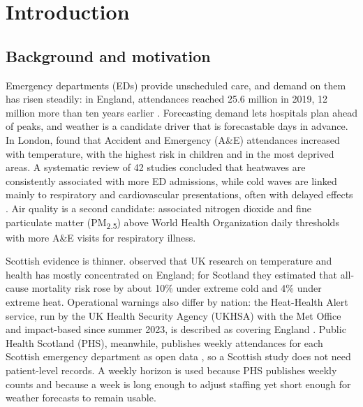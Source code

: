 \documentclass[12pt]{article}
\makeatletter
\let\thedate\@date
\makeatother
\begin{document}
\begin{titlepage}

	\vfill

\end{titlepage}




\newpage
\tableofcontents
\listoftables
\listoffigures

\newpage

\section{Introduction}

\subsection{Background and motivation}
Emergency departments (EDs) provide unscheduled care, and demand on them has risen steadily: in England, attendances reached 25.6 million in 2019, 12 million more than ten years earlier \parencite{vollmer2021}. Forecasting demand lets hospitals plan ahead of peaks, and weather is a candidate driver that is forecastable days in advance. In London, \textcite{corcuerahotz2020} found that Accident and Emergency (A\&E) attendances increased with temperature, with the highest risk in children and in the most deprived areas. A systematic review of 42 studies concluded that heatwaves are consistently associated with more ED admissions, while cold waves are linked mainly to respiratory and cardiovascular presentations, often with delayed effects \parencite{poshtmashhadi2025}. Air quality is a second candidate: \textcite{mebrahtu2023} associated nitrogen dioxide and fine particulate matter (PM\textsubscript{2.5}) above World Health Organization daily thresholds with more A\&E visits for respiratory illness.

Scottish evidence is thinner. \textcite{wan2022} observed that UK research on temperature and health has mostly concentrated on England; for Scotland they estimated that all-cause mortality risk rose by about 10\% under extreme cold and 4\% under extreme heat. Operational warnings also differ by nation: the Heat-Health Alert service, run by the UK Health Security Agency (UKHSA) with the Met Office and impact-based since summer 2023, is described as covering England \parencite{metoffice_hha,roberts2025}. Public Health Scotland (PHS), meanwhile, publishes weekly attendances for each Scottish emergency department as open data \parencite{phs_weekly_ae}, so a Scottish study does not need patient-level records. A weekly horizon is used because PHS publishes weekly counts and because a week is long enough to adjust staffing yet short enough for weather forecasts to remain usable.
\end{document}
